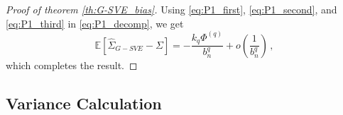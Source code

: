 \documentclass[11pt]{article}
\theoremstyle{remark}
\begin{document}
\begin{proof}[Proof of theorem \ref{th:G-SVE_bias}]
%
Using \eqref{eq:P1_first}, \eqref{eq:P1_second}, and \eqref{eq:P1_third} in \eqref{eq:P1_decomp}, we get
\[
\mathbb{E} \left[\hat{\Sigma}_{G-SVE} - \Sigma \right] = -\dfrac{k_q \Phi^{(q)} }{b_n^q} + o\left( \dfrac{1}{b_n^q} \right)\,,
\]
which completes the result.
%
\end{proof}
\subsection{Variance Calculation}
\label{appendix:variance}
 
\end{document}
